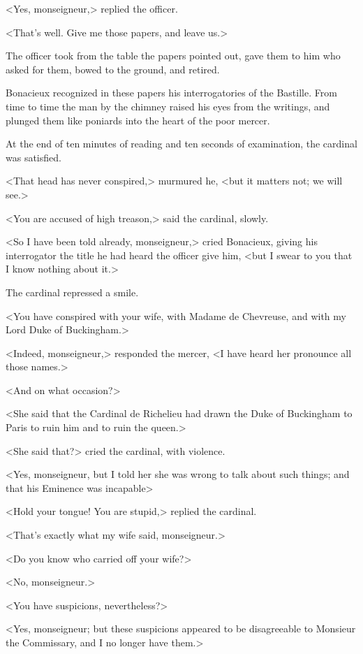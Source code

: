 <Yes, monseigneur,> replied the officer. 

<That's well. Give me those papers, and leave us.> 

The officer took from the table the papers pointed out, gave them to him who asked for them, bowed to the ground, and retired. 

Bonacieux recognized in these papers his interrogatories of the Bastille. From time to time the man by the chimney raised his eyes from the writings, and plunged them like poniards into the heart of the poor mercer. 

At the end of ten minutes of reading and ten seconds of examination, the cardinal was satisfied. 

<That head has never conspired,> murmured he, <but it matters not; we will see.> 

<You are accused of high treason,> said the cardinal, slowly. 

<So I have been told already, monseigneur,> cried Bonacieux, giving his interrogator the title he had heard the officer give him, <but I swear to you that I know nothing about it.> 

The cardinal repressed a smile. 

<You have conspired with your wife, with Madame de Chevreuse, and with my Lord Duke of Buckingham.> 

<Indeed, monseigneur,> responded the mercer, <I have heard her pronounce all those names.> 

<And on what occasion?> 

<She said that the Cardinal de Richelieu had drawn the Duke of Buckingham to Paris to ruin him and to ruin the queen.> 

<She said that?> cried the cardinal, with violence. 

<Yes, monseigneur, but I told her she was wrong to talk about such things; and that his Eminence was incapable\longdash> 

<Hold your tongue! You are stupid,> replied the cardinal. 

<That's exactly what my wife said, monseigneur.> 

<Do you know who carried off your wife?> 

<No, monseigneur.> 

<You have suspicions, nevertheless?> 

<Yes, monseigneur; but these suspicions appeared to be disagreeable to Monsieur the Commissary, and I no longer have them.> 

